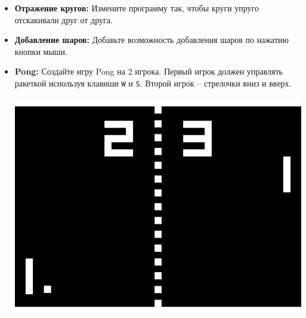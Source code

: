 \documentclass{article}
\begin{document}
\begin{itemize}
\item \textbf{Отражение кругов:} Измените программу так, чтобы круги упруго отскакивали друг от друга.
\item \textbf{Добавление шаров:} Добавьте возможность добавления шаров по нажатию кнопки мыши.
\item \textbf{Pong:} Создайте игру Pong на 2 игрока. Первый игрок должен управлять ракеткой используя клавиши \texttt{W} и \texttt{S}. Второй игрок -- стрелочки вниз и вверх.
\begin{center}
\includegraphics[scale=0.5]{../images/pong.png}
\end{center}
\end{itemize}
\end{document}
